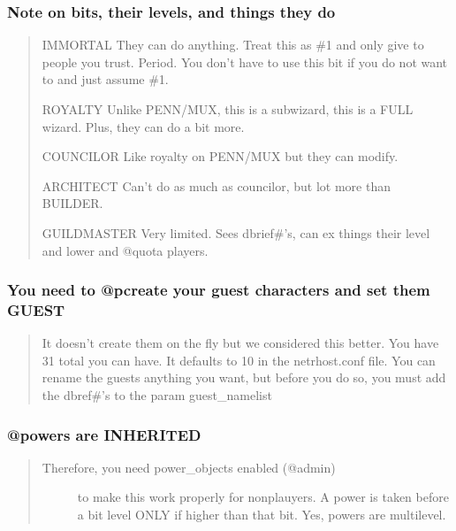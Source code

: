 \documentclass[letterpaper,10pt,english]{sphinxmanual}
\begin{document}
\subsubsection{Note on bits, their levels, and things they do}
\label{\detokenize{features:note-on-bits-their-levels-and-things-they-do}}\begin{quote}

\sphinxAtStartPar
IMMORTAL \sphinxhyphen{} They can do anything.  Treat this as \#1 and only give to
people you trust.  Period.   You don’t have to use this bit
if you do not want to and just assume \#1.

\sphinxAtStartPar
ROYALTY \sphinxhyphen{} Unlike PENN/MUX, this is  a sub\sphinxhyphen{}wizard, this is a
FULL wizard.  Plus, they can do a bit more.

\sphinxAtStartPar
COUNCILOR \sphinxhyphen{} Like royalty on PENN/MUX but they can modify.

\sphinxAtStartPar
ARCHITECT \sphinxhyphen{} Can’t do as much as councilor, but lot more than BUILDER.

\sphinxAtStartPar
GUILDMASTER \sphinxhyphen{} Very limited.  Sees dbrief\#’s, can ex things their
level and lower and @quota players.
\end{quote}


\subsubsection{You need to @pcreate your guest characters and set them GUEST}
\label{\detokenize{features:you-need-to-pcreate-your-guest-characters-and-set-them-guest}}\begin{quote}

\sphinxAtStartPar
It doesn’t create them on the fly but we considered this better.
You have 31 total you can have.  It defaults to 10 in the
netrhost.conf file.  You can rename the guests anything you want,
but before you do so, you must add the dbref\#’s to the param
guest\_namelist
\end{quote}


\subsubsection{@powers are INHERITED}
\label{\detokenize{features:powers-are-inherited}}\begin{quote}
\begin{description}
\item[{Therefore, you need power\_objects enabled (@admin)}] \leavevmode
\sphinxAtStartPar
to make this work properly for non\sphinxhyphen{}plauyers.
A power is taken before a bit level ONLY if higher than that bit.
Yes, powers are multi\sphinxhyphen{}level.

\end{description}
\end{quote}
\end{document}
